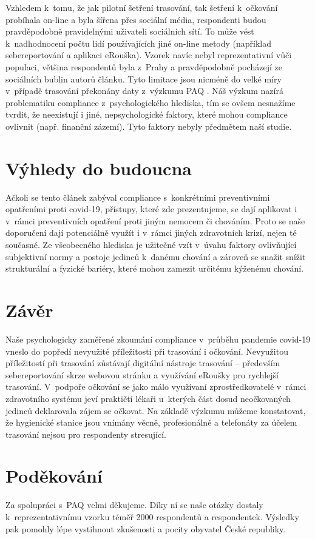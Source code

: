 Vzhledem k~tomu, že jak pilotní šetření trasování, tak šetření k~očkování probíhala on-line a byla šířena přes sociální média, respondenti budou pravděpodobně pravidelnými uživateli sociálních sítí. To může vést k~nadhodnocení počtu lidí používajících jiné on-line metody (například sebereportování a aplikaci eRouška). 
Vzorek navíc nebyl reprezentativní vůči populaci, většina respondentů byla z~Prahy a pravděpodobně pocházejí ze sociálních bublin autorů článku.
Tyto limitace jsou nicméně do velké míry v~případě trasování překonány daty z~výzkumu PAQ \cite{Prokop2021a}.
Náš výzkum nazírá problematiku compliance z~psychologického hlediska, tím se ovšem nesnažíme tvrdit, že neexistují i jiné, nepsychologické faktory, které mohou compliance ovlivnit (např. finanční zázemí). Tyto faktory nebyly předmětem naší studie.


\section*{Výhledy do budoucna }

Ačkoli se tento článek zabýval compliance s~konkrétními preventivními opatřeními proti covid-19, přístupy, které zde prezentujeme, se dají aplikovat i v~rámci preventivních opatření proti jiným nemocem či chováním. Proto se naše doporučení dají potenciálně využít i v~rámci jiných zdravotních krizí, nejen té současné. Ze všeobecného hlediska je užitečné vzít v~úvahu faktory ovlivňující subjektivní normy a postoje jedinců k~danému chování a zároveň se snažit snížit strukturální a fyzické bariéry, které mohou zamezit určitému kýženému chování. 

\section*{Závěr}

Naše psychologicky zaměřené zkoumání compliance v~průběhu pandemie covid-19 vneslo do popředí nevyužité příležitosti při trasování i očkování. Nevyužitou pří\-le\-ži\-tos\-tí při trasování zůstávají digitální nástroje trasování -- především sebereportování skrze webovou stránku a využívání eRoušky pro rychlejší trasování. V~podpoře očkování se jako málo využívaní zprostředkovatelé v~rámci zdravotního systému jeví praktičtí lékaři u~kterých část dosud neočkovaných jedinců deklarovala zájem se očkovat. Na základě výzkumu můžeme konstatovat, že hygienické stanice jsou vnímány věcně, profesionálně a telefonáty za účelem trasování nejsou pro respondenty stresující. 

\section*{Poděkování}

Za spolupráci s~PAQ velmi děkujeme. Díky ní se naše otázky dostaly k~reprezentativnímu vzorku téměř 2000 respondentů a respondentek. Výsledky pak pomohly lépe vystihnout zkušenosti a pocity obyvatel České republiky.